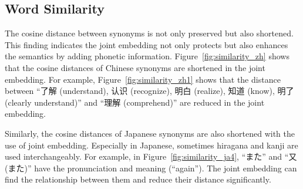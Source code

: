 \subsection{Word Similarity} \label{sec:analysis_similarity}
\begin{CJK}{UTF8}{gbsn}
    The cosine distance between synonyms is not only preserved but also shortened. This finding indicates the joint embedding not only protects but also enhances the semantics by adding phonetic information. Figure~\ref{fig:similarity_zh} shows that the cosine distances of Chinese synonyms are shortened in the joint embedding. For example, Figure~\ref{fig:similarity_zh1} shows that the distance between ``了解 (understand), 认识 (recognize), 明白 (realize), 知道 (know), 明了 (clearly understand)'' and ``理解 (comprehend)'' are reduced in the joint embedding.
\end{CJK}

\begin{CJK}{UTF8}{ipxm}
    Similarly, the cosine distances of Japanese synonyms are also shortened with the use of joint embedding. Especially in Japanese, sometimes hiragana and kanji are used interchangeably. For example, in Figure~\ref{fig:similarity_ja4}, ``また'' and ``又 (また)'' have the pronunciation and meaning (``again''). The joint embedding can find the relationship between them and reduce their distance significantly.
\end{CJK}

